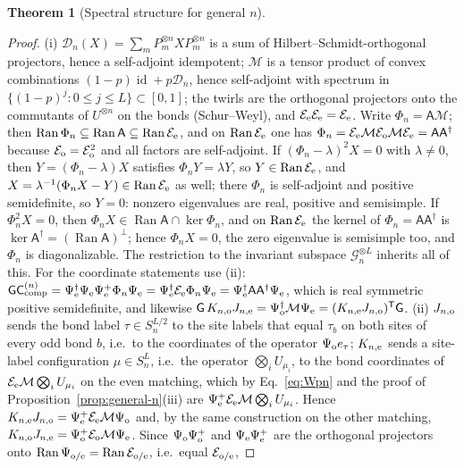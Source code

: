 \documentclass[aps,prx,reprint,superscriptaddress,nobibnotes,longbibliography]{revtex4-2}
\newtheorem{theorem}{Theorem}
\theoremstyle{remark}
\newcommand{\id}{\operatorname{id}}
\newcommand{\Ran}{\operatorname{Ran}}
\newcommand{\Ccomp}{\mathsf C_{\rm comp}}
\begin{document}
\begin{theorem}[Spectral structure for general $n$]
\begin{enumerate}
\end{enumerate}
\end{theorem}

\begin{proof}
(i) $\mathcal D_n(X)=\sum_mP_m^{\otimes n}XP_m^{\otimes n}$ is a sum of Hilbert--Schmidt-orthogonal projectors, hence a self-adjoint idempotent; $\mathcal M$ is a tensor product of convex combinations $(1-p)\id+p\mathcal D_n$, hence self-adjoint with spectrum in $\{(1-p)^j:0\le j\le L\}\subset[0,1]$; the twirls are the orthogonal projectors onto the commutants of $U^{\otimes n}$ on the bonds (Schur--Weyl), and $\mathcal E_{\rm e}\mathcal E_{\rm e}=\mathcal E_{\rm e}$.  Write $\Phi_n=\mathsf A\mathcal M$; then $\Ran\Phi_n\subseteq\Ran\mathsf A\subseteq\Ran\mathcal E_{\rm e}$, and on $\Ran\mathcal E_{\rm e}$ one has $\Phi_n=\mathcal E_{\rm e}\mathcal M\mathcal E_{\rm o}\mathcal M\mathcal E_{\rm e}=\mathsf A\mathsf A^\dagger$ because $\mathcal E_{\rm o}=\mathcal E_{\rm o}^2$ and all factors are self-adjoint.  If $(\Phi_n-\lambda)^2X=0$ with $\lambda\ne0$, then $Y=(\Phi_n-\lambda)X$ satisfies $\Phi_nY=\lambda Y$, so $Y\in\Ran\mathcal E_{\rm e}$, and $X=\lambda^{-1}(\Phi_nX-Y)\in\Ran\mathcal E_{\rm e}$ as well; there $\Phi_n$ is self-adjoint and positive semidefinite, so $Y=0$: nonzero eigenvalues are real, positive and semisimple.  If $\Phi_n^2X=0$, then $\Phi_nX\in\Ran\mathsf A\cap\ker\Phi_n$, and on $\Ran\mathcal E_{\rm e}$ the kernel of $\Phi_n=\mathsf A\mathsf A^\dagger$ is $\ker\mathsf A^\dagger=(\Ran\mathsf A)^\perp$; hence $\Phi_nX=0$, the zero eigenvalue is semisimple too, and $\Phi_n$ is diagonalizable.  The restriction to the invariant subspace $\mathcal G_n^{\otimes L}$ inherits all of this.  For the coordinate statements use (ii): $\mathsf G\Ccomp^{(n)}=\Psi_{\rm e}^\dagger\Psi_{\rm e}\Psi_{\rm e}^+\Phi_n\Psi_{\rm e}=\Psi_{\rm e}^\dagger\mathcal E_{\rm e}\Phi_n\Psi_{\rm e}=\Psi_{\rm e}^\dagger\mathsf A\mathsf A^\dagger\Psi_{\rm e}$, which is real symmetric positive semidefinite, and likewise $\mathsf G\,K_{n,{\rm o}}J_{n,{\rm e}}=\Psi_{\rm o}^\dagger\mathcal M\Psi_{\rm e}=(K_{n,{\rm e}}J_{n,{\rm o}})^{\mathsf T}\mathsf G$.
(ii) $J_{n,{\rm o}}$ sends the bond label $\tau\in S_n^{L/2}$ to the site labels that equal $\tau_b$ on both sites of every odd bond $b$, i.e.\ to the coordinates of the operator $\Psi_{\rm o}e_\tau$; $K_{n,{\rm e}}$ sends a site-label configuration $\mu\in S_n^L$, i.e.\ the operator $\bigotimes_iU_{\mu_i}$, to the bond coordinates of $\mathcal E_{\rm e}\mathcal M\bigotimes_iU_{\mu_i}$ on the even matching, which by Eq.~\eqref{eq:Wpn} and the proof of Proposition~\ref{prop:general-n}(iii) are $\Psi_{\rm e}^+\mathcal E_{\rm e}\mathcal M\bigotimes_iU_{\mu_i}$.  Hence $K_{n,{\rm e}}J_{n,{\rm o}}=\Psi_{\rm e}^+\mathcal E_{\rm e}\mathcal M\Psi_{\rm o}$ and, by the same construction on the other matching, $K_{n,{\rm o}}J_{n,{\rm e}}=\Psi_{\rm o}^+\mathcal E_{\rm o}\mathcal M\Psi_{\rm e}$.  Since $\Psi_{\rm o}\Psi_{\rm o}^+$ and $\Psi_{\rm e}\Psi_{\rm e}^+$ are the orthogonal projectors onto $\Ran\Psi_{\rm o/e}=\Ran\mathcal E_{\rm o/e}$, i.e.\ equal $\mathcal E_{\rm o/e}$,

\end{proof}
\end{document}
